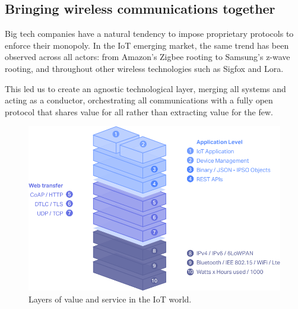 \subsection{Bringing wireless communications together}
Big tech companies have a natural tendency to impose proprietary protocols to enforce their monopoly. In the IoT emerging market, the same trend has been observed across all actors: from Amazon’s Zigbee rooting to Samsung’s z-wave rooting, and throughout other wireless technologies such as Sigfox and Lora.

This led us to create an agnostic technological layer, merging all systems and acting as a conductor, orchestrating all communications with a fully open protocol that shares value for all rather than extracting value for the few.

\begin{figure}
	\includegraphics[width=\linewidth, trim= 0cm 0cm 0cm 0cm, clip]{Figures/iot.png}
	\caption{Layers of value and service in the IoT world.}
	\label{fig:iot}
\end{figure}

